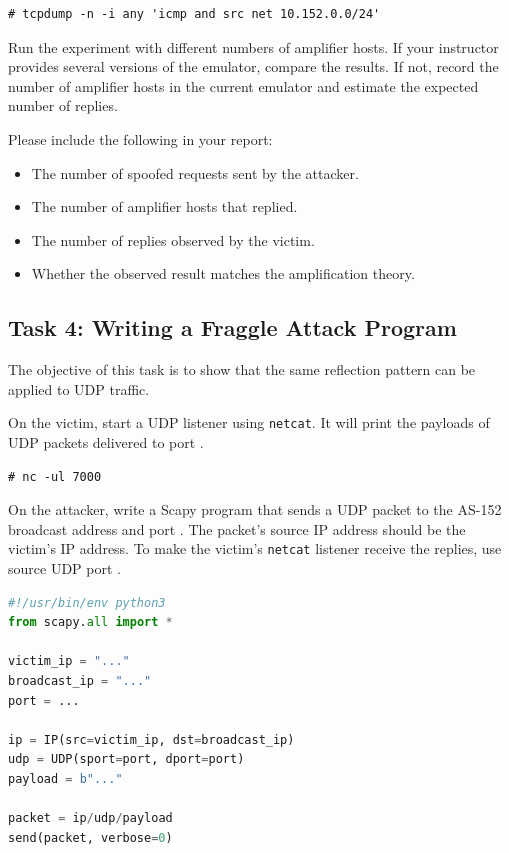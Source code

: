 \begin{lstlisting}
# tcpdump -n -i any 'icmp and src net 10.152.0.0/24'
\end{lstlisting}

Run the experiment with different numbers of amplifier hosts. If your instructor
provides several versions of the emulator, compare the results. If not, record
the number of amplifier hosts in the current emulator and estimate the expected
number of replies.

Please include the following in your report:

\begin{itemize}[noitemsep]
\item The number of spoofed requests sent by the attacker.
\item The number of amplifier hosts that replied.
\item The number of replies observed by the victim.
\item Whether the observed result matches the amplification theory.
\end{itemize}


\subsection{Task 4: Writing a Fraggle Attack Program}

The objective of this task is to show that the same reflection pattern can be
applied to UDP traffic.

On the victim, start a UDP listener using \texttt{netcat}. It will print the
payloads of UDP packets delivered to port \fraggleport.

\begin{lstlisting}
# nc -ul 7000
\end{lstlisting}

On the attacker, write a Scapy program that sends a UDP packet to the AS-152
broadcast address and port \fraggleport. The packet's source IP address should
be the victim's IP address. To make the victim's \texttt{netcat} listener
receive the replies, use source UDP port \fraggleport.

\begin{lstlisting}[language=python]
#!/usr/bin/env python3
from scapy.all import *

victim_ip = "..."
broadcast_ip = "..."
port = ...

ip = IP(src=victim_ip, dst=broadcast_ip)
udp = UDP(sport=port, dport=port)
payload = b"..."

packet = ip/udp/payload
send(packet, verbose=0)
\end{lstlisting}

